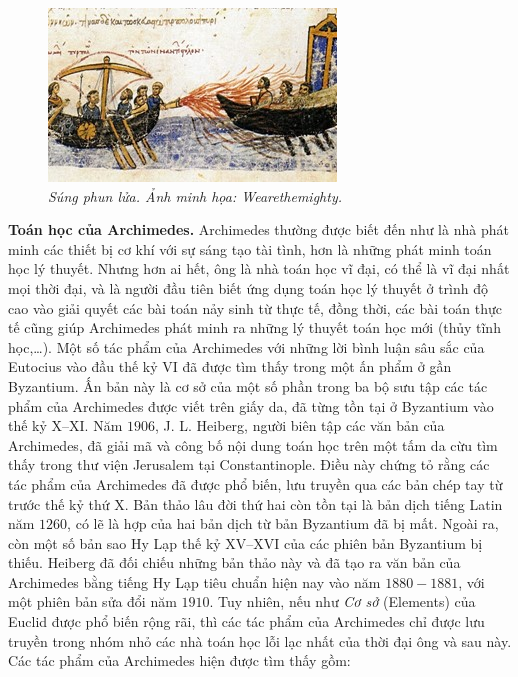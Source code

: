 \begin{multicols}{2}
\begin{figure}[H]
		\includegraphics[width= 1\linewidth]{5}
		\caption{\small\textit{\color{lichsutoanhoc}Súng phun lửa. Ảnh minh họa: Wearethemighty.}}
		\vspace*{-10pt}
	\end{figure}
	\textbf{\color{lichsutoanhoc}Toán học của Archimedes.} Archimedes thường được biết đến như là nhà phát minh các thiết bị cơ khí với sự sáng tạo tài tình, hơn là những phát minh toán học lý thuyết. Nhưng hơn ai hết, ông là nhà toán học vĩ đại, có thể là vĩ đại nhất mọi thời đại, và là người đầu tiên biết ứng dụng toán học lý thuyết ở trình độ cao vào giải quyết các bài toán nảy sinh từ thực tế, đồng thời, các bài toán thực tế cũng giúp Archimedes phát minh ra những lý thuyết toán học mới (thủy tĩnh học,\ldots).
	\vskip 0.1cm 
	Một số tác phẩm của Archimedes với những lời bình luận sâu sắc của Eutocius vào đầu thế kỷ VI đã được tìm thấy trong một ấn phẩm ở gần Byzantium. Ấn bản này là cơ sở của một số phần trong ba bộ sưu tập các tác phẩm của Archimedes được viết trên giấy da, đã từng tồn tại ở Byzantium vào thế kỷ X--XI. Năm $1906$, J. L. Heiberg, người biên tập các văn bản của Archimedes, đã giải mã và công bố nội dung toán học trên một tấm da cừu tìm thấy trong thư viện Jerusalem tại Constantinople. Điều này chứng tỏ rằng các tác phẩm của Archimedes đã được phổ biến, lưu truyền qua các bản chép tay từ trước thế kỷ thứ X. Bản thảo lâu đời thứ hai còn tồn tại là bản dịch tiếng Latin năm $1260$, có lẽ là hợp của hai bản dịch từ bản Byzantium đã bị mất. Ngoài ra, còn một số bản sao Hy Lạp thế kỷ XV--XVI của các phiên bản Byzantium bị thiếu. Heiberg đã đối chiếu những bản thảo này và đã tạo ra văn bản của Archimedes bằng tiếng Hy Lạp tiêu chuẩn hiện nay vào năm $1880-1881$, với một phiên bản sửa đổi năm $1910$. Tuy nhiên, nếu như  \textit{Cơ sở} (Elements) của Euclid được phổ biến rộng rãi, thì các tác phẩm của Archimedes chỉ được lưu truyền trong nhóm nhỏ các nhà toán học lỗi lạc nhất của thời đại ông và sau này. Các tác phẩm của Archimedes hiện được tìm thấy gồm:

\end{multicols}
